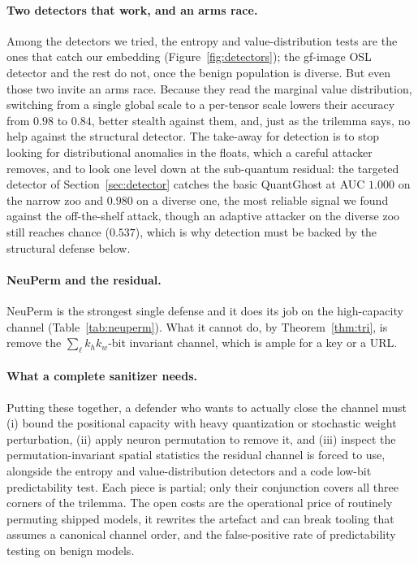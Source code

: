 \documentclass[10pt,journal]{IEEEtran}
\theoremstyle{remark}
\newcommand{\sys}{\mbox{QuantGhost}}
\begin{document}
\paragraph{Two detectors that work, and an arms race.} Among the detectors we tried,
the entropy and value-distribution tests are the ones that catch our embedding
(Figure~\ref{fig:detectors}); the gf-image OSL detector and the rest do not, once the
benign population is diverse. But even those two invite an arms race. Because they read
the marginal value distribution, switching from a single global scale to a per-tensor
scale lowers their accuracy from $0.98$ to $0.84$, better stealth against them, and,
just as the trilemma says, no help against the structural detector. The take-away for
detection is to stop looking for distributional anomalies in the floats, which a careful
attacker removes, and to look one level down at the sub-quantum residual: the targeted
detector of Section~\ref{sec:detector} catches the basic \sys{} at AUC $1.000$ on the
narrow zoo and $0.980$ on a diverse one, the most reliable signal we found against the
off-the-shelf attack, though an adaptive attacker on the diverse zoo still reaches chance
($0.537$), which is why detection must be backed by the structural defense below.

\paragraph{NeuPerm and the residual.} NeuPerm is the strongest single defense and it
does its job on the high-capacity channel (Table~\ref{tab:neuperm}). What it cannot do,
by Theorem~\ref{thm:tri}, is remove the $\sum_\ell k_h k_w$-bit invariant channel,
which is ample for a key or a URL.

\paragraph{What a complete sanitizer needs.} Putting these together, a defender who
wants to actually close the channel must (i) bound the positional capacity with heavy
quantization or stochastic weight perturbation, (ii) apply neuron permutation to remove
it, and (iii) inspect the permutation-invariant spatial statistics the residual channel
is forced to use, alongside the entropy and value-distribution detectors and a code
low-bit predictability test. Each piece is partial; only their conjunction covers all
three corners of the trilemma. The open costs are the operational price of routinely
permuting shipped models, it rewrites the artefact and can break tooling that
assumes a canonical channel order, and the false-positive rate of predictability
testing on benign models.
\end{document}
